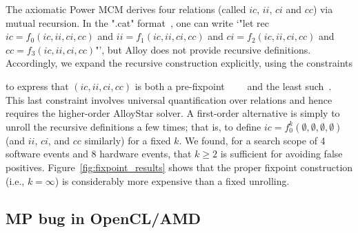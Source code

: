 The axiomatic Power MCM derives four relations (called $ic$, $ii$,
$ci$ and $cc$) via mutual recursion. In the ".cat"
format~\cite{alglave+14}, one can write `"let rec $ic = f_0(ic,ii,ci,cc)$ and $ii =
f_1(ic,ii,ci,cc)$ and $ci = f_2(ic,ii,ci,cc)$ and $cc = f_3(ic,ii,ci,cc)$"', but Alloy does not provide recursive
definitions. Accordingly, we expand the recursive construction explicitly, using the constraints
%
to express that $(ic,ii,ci,cc)$ is both a
pre-fixpoint~~~~
and the least such~. This last constraint involves
universal quantification over relations and hence requires the
higher-order AlloyStar solver. A first-order alternative is simply to
unroll the recursive definitions a few times; that is, to define
$ic = f_0^k(\emptyset,\emptyset,\emptyset,\emptyset)$ (and $ii$, $ci$,
and $cc$ similarly) for a fixed $k$. We found, for a search scope of 4
software events and 8 hardware events, that $k\ge 2$ is sufficient for
avoiding false positives. Figure~\ref{fig:fixpoint_results} shows that
the proper fixpoint construction (i.e., $k=\infty$) is considerably
more expensive than a fixed unrolling.

\subsection{MP bug in OpenCL/AMD}


